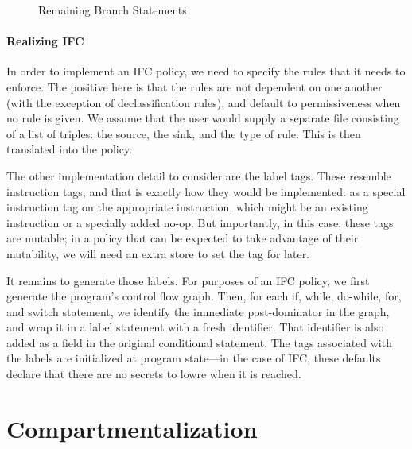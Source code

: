 \documentclass[acmsmall,review,anonymous]{acmart}\settopmatter{printfolios=true,printccs=false,printacmref=false}
\begin{document}
\begin{figure}
\begin{subfigure}{\textwidth}
  \end{subfigure}

  
  
  \caption{Remaining Branch Statements}
  \label{fig:rest}
\end{figure}

\paragraph*{Realizing IFC}

In order to implement an IFC policy, we need to specify the rules that it needs to enforce.
The positive here is that the rules are not dependent on one another (with the exception of
declassification rules), and default to permissiveness when no rule is given. We assume that
the user would supply a separate file consisting of a list of triples: the source, the sink,
and the type of rule. This is then translated into the policy.

The other implementation detail to consider are the label tags. These resemble
instruction tags, and that is exactly how they would be implemented: as a special instruction
tag on the appropriate instruction, which might be an existing instruction or a specially
added no-op. But importantly, in this case, these tags are mutable; in a policy that can be
expected to take advantage of their mutability, we will need an extra store to set the tag
for later.

It remains to generate those labels. For purposes of an IFC policy, we first generate the program's
control flow graph. Then, for each if, while, do-while, for, and switch statement, we identify the
immediate post-dominator in the graph, and wrap it in a label statement with a fresh identifier.
That identifier is also added as a field in the original conditional statement. The tags
associated with the labels are initialized at program state---in the case of IFC, these defaults
declare that there are no secrets to lowre when it is reached.

\section{Compartmentalization}
\label{sec:comp}
\end{document}
